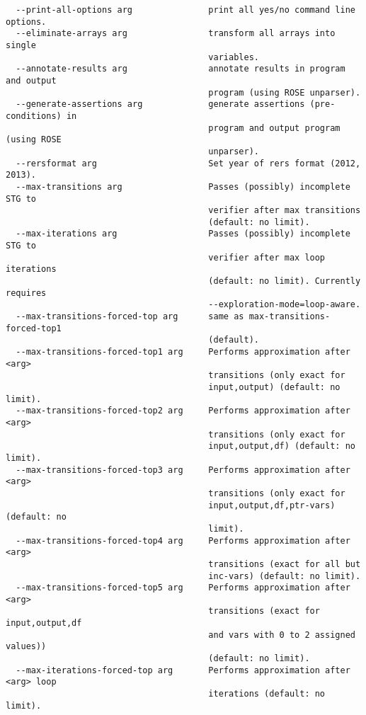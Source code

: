 \documentclass[natbib]{article}
\begin{document}
\begin{verbatim}
  --print-all-options arg               print all yes/no command line options.
  --eliminate-arrays arg                transform all arrays into single 
                                        variables.
  --annotate-results arg                annotate results in program and output 
                                        program (using ROSE unparser).
  --generate-assertions arg             generate assertions (pre-conditions) in
                                        program and output program (using ROSE 
                                        unparser).
  --rersformat arg                      Set year of rers format (2012, 2013).
  --max-transitions arg                 Passes (possibly) incomplete STG to 
                                        verifier after max transitions 
                                        (default: no limit).
  --max-iterations arg                  Passes (possibly) incomplete STG to 
                                        verifier after max loop iterations 
                                        (default: no limit). Currently requires
                                        --exploration-mode=loop-aware.
  --max-transitions-forced-top arg      same as max-transitions-forced-top1 
                                        (default).
  --max-transitions-forced-top1 arg     Performs approximation after <arg> 
                                        transitions (only exact for 
                                        input,output) (default: no limit).
  --max-transitions-forced-top2 arg     Performs approximation after <arg> 
                                        transitions (only exact for 
                                        input,output,df) (default: no limit).
  --max-transitions-forced-top3 arg     Performs approximation after <arg> 
                                        transitions (only exact for 
                                        input,output,df,ptr-vars) (default: no 
                                        limit).
  --max-transitions-forced-top4 arg     Performs approximation after <arg> 
                                        transitions (exact for all but 
                                        inc-vars) (default: no limit).
  --max-transitions-forced-top5 arg     Performs approximation after <arg> 
                                        transitions (exact for input,output,df 
                                        and vars with 0 to 2 assigned values)) 
                                        (default: no limit).
  --max-iterations-forced-top arg       Performs approximation after <arg> loop
                                        iterations (default: no limit). 

\end{verbatim}
\end{document}
